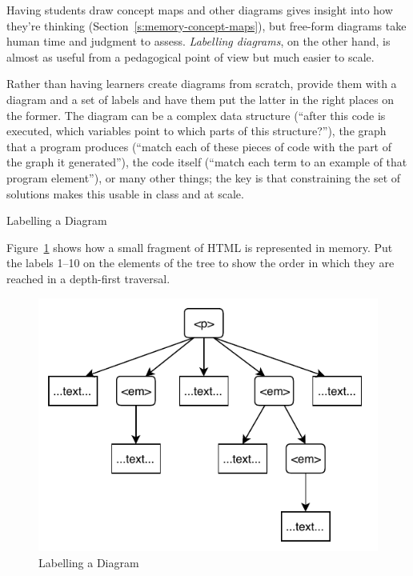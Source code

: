 Having students draw concept maps and other diagrams gives insight into
how they're thinking (Section~\ref{s:memory-concept-maps}), but free-form
diagrams take human time and judgment to assess. \emph{Labelling diagrams},
on the other hand, is almost as useful from a pedagogical point of view
but much easier to scale.

Rather than having learners create diagrams from scratch, provide them
with a diagram and a set of labels and have them put the latter in the
right places on the former. The diagram can be a complex data structure
(``after this code is executed, which variables point to which parts of
this structure?''), the graph that a program produces (``match each of
these pieces of code with the part of the graph it generated''), the code
itself (``match each term to an example of that program element''), or
many other things; the key is that constraining the set of solutions
makes this usable in class and at scale.

\begin{aside}{Labelling a Diagram}

Figure~\ref{f:exercises-labelling} shows how a small fragment of HTML is represented in
memory. Put the labels 1--10 on the elements of the tree to show the
order in which they are reached in a depth-first traversal.

\end{aside}

\begin{figure}
\centering
\includegraphics{../../figures/labelling.pdf}
\caption{Labelling a Diagram}
\label{f:exercises-labelling}
\end{figure}

